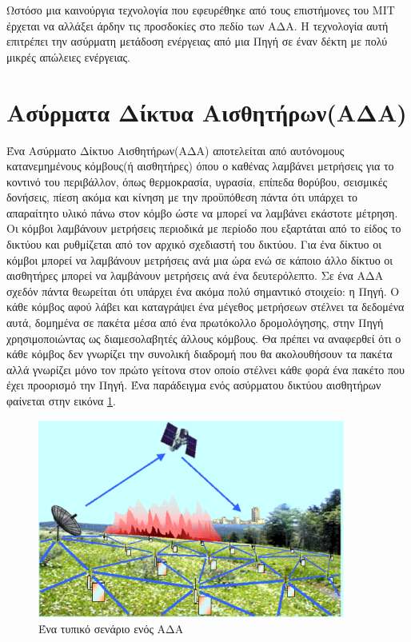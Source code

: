 Ωστόσο μια καινούργια τεχνολογία που εφευρέθηκε από τους επιστήμονες του MIT \cite{power_mit_1} έρχεται να αλλάξει άρδην τις προσδοκίες στο πεδίο των ΑΔΑ. Η
τεχνολογία
αυτή επιτρέπει την ασύρματη μετάδοση ενέργειας από μια Πηγή σε έναν δέκτη με πολύ μικρές απώλειες ενέργειας.






\section{Ασύρματα Δίκτυα Αισθητήρων(ΑΔΑ)}
Ένα Ασύρματο Δίκτυο Αισθητήρων(ΑΔΑ) αποτελείται από αυτόνομους κατανεμημένους κόμβους(ή αισθητήρες) όπου ο καθένας λαμβάνει μετρήσεις για το κοντινό του περιβάλλον,
όπως θερμοκρασία, υγρασία, επίπεδα θορύβου, σεισμικές δονήσεις, πίεση ακόμα και κίνηση με την προϋπόθεση πάντα ότι υπάρχει το απαραίτητο υλικό πάνω στον κόμβο ώστε
να μπορεί να λαμβάνει εκάστοτε μέτρηση.
Οι κόμβοι λαμβάνουν μετρήσεις περιοδικά με περίοδο που εξαρτάται από το είδος το δικτύου και ρυθμίζεται από τον αρχικό σχεδιαστή του δικτύου.
Για ένα δίκτυο οι κόμβοι μπορεί να λαμβάνουν μετρήσεις ανά μια ώρα ενώ σε κάποιο άλλο δίκτυο οι αισθητήρες μπορεί να λαμβάνουν μετρήσεις ανά ένα δευτερόλεπτο.
Σε ένα ΑΔΑ σχεδόν πάντα θεωρείται ότι υπάρχει ένα ακόμα πολύ σημαντικό στοιχείο: η Πηγή.
Ο κάθε κόμβος αφού λάβει και καταγράψει ένα μέγεθος μετρήσεων στέλνει τα δεδομένα αυτά, δομημένα σε πακέτα μέσα από ένα πρωτόκολλο δρομολόγησης, στην Πηγή
χρησιμοποιώντας ως διαμεσολαβητές άλλους κόμβους.
Θα πρέπει να αναφερθεί ότι ο κάθε κόμβος δεν γνωρίζει την συνολική διαδρομή που θα ακολουθήσουν τα πακέτα αλλά γνωρίζει μόνο τον πρώτο γείτονα στον οποίο στέλνει κάθε
φορά ένα πακέτο που έχει προορισμό την Πηγή. Ένα παράδειγμα ενός ασύρματου δικτύου αισθητήρων φαίνεται στην εικόνα \ref{fig:farm}.

\begin{figure}[h]
	\centering
	\includegraphics[width=0.9\textwidth]{images/sensor_network.eps}
	\caption{Ένα τυπικό σενάριο ενός ΑΔΑ}
	\label{fig:farm}
\end{figure}

